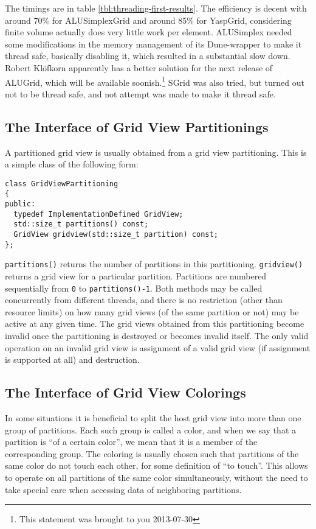 \documentclass{article}
\newcommand\dune{Dune\xspace}
\begin{document}
The timings are in table \ref{tbl:threading-first-results}.  The efficiency is
decent with around 70\% for ALUSimplexGrid and around 85\% for YaspGrid,
considering finite volume actually does very little work per element.
ALUSimplex needed some modifications in the memory management of its
\dune-wrapper to make it thread safe, basically disabling it, which resulted
in a substantial slow down.  Robert Klöfkorn apparently has a better solution
for the next release of ALUGrid, which will be available
soonish.\footnote{This statement was brought to you 2013-07-30} SGrid was also
tried, but turned out not to be thread safe, and not attempt was made to make
it thread safe.

\subsection{The Interface of Grid View Partitionings}

A partitioned grid view is usually obtained from a grid view partitioning.
This is a simple class of the following form:
\begin{lstlisting}
class GridViewPartitioning
{
public:
  typedef ImplementationDefined GridView;
  std::size_t partitions() const;
  GridView gridview(std::size_t partition) const;
};
\end{lstlisting}

{\tt partitions()} returns the number of partitions in this partitioning.
{\tt gridview()} returns a grid view for a particular partition.  Partitions
are numbered sequentially from {\tt 0} to {\tt partitions()-1}.  Both methods
may be called concurrently from different threads, and there is no restriction
(other than resource limits) on how many grid views (of the same partition or
not) may be active at any given time.  The grid views obtained from this
partitioning become invalid once the partitioning is destroyed or becomes
invalid itself.  The only valid operation on an invalid grid view is
assignment of a valid grid view (if assignment is supported at all) and
destruction.

\subsection{The Interface of Grid View Colorings}

In some situations it is beneficial to split the host grid view into more than
one group of partitions.  Each such group is called a color, and when we say
that a partition is ``of a certain color'', we mean that it is a member of the
corresponding group.  The coloring is usually chosen such that partitions of
the same color do not touch each other, for some definition of ``to touch''.
This allows to operate on all partitions of the same color simultaneously,
without the need to take special care when accessing data of neighboring
partitions.
\end{document}
